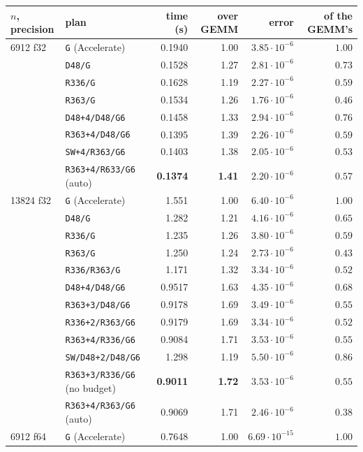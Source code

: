 \documentclass[11pt]{article}
\newcommand{\lv}[1]{\texttt{#1}}
\begin{document}
\begin{table}[tp]
\centering\small
\begin{tabular}{llrrrr}
\toprule
$n$, precision & plan & time (s) & over GEMM & error & of the GEMM's\\
\midrule
6912 f32 & \lv{G} (Accelerate) & 0.1940 & 1.00 & $3.85\cdot10^{-6}$ & $1.00$\\
 & \lv{D48/G} & 0.1528 & 1.27 & $2.81\cdot10^{-6}$ & $0.73$\\
 & \lv{R336/G} & 0.1628 & 1.19 & $2.27\cdot10^{-6}$ & $0.59$\\
 & \lv{R363/G} & 0.1534 & 1.26 & $1.76\cdot10^{-6}$ & $0.46$\\
 & \lv{D48+4/D48/G6} & 0.1458 & 1.33 & $2.94\cdot10^{-6}$ & $0.76$\\
 & \lv{R363+4/D48/G6} & 0.1395 & 1.39 & $2.26\cdot10^{-6}$ & $0.59$\\
 & \lv{SW+4/R363/G6} & 0.1403 & 1.38 & $2.05\cdot10^{-6}$ & $0.53$\\
\rowcolor{cR!12} & \lv{R363+4/R633/G6} (auto) & \textbf{0.1374} & \textbf{1.41} & $2.20\cdot10^{-6}$ & $0.57$\\
\midrule
13824 f32 & \lv{G} (Accelerate) & 1.551 & 1.00 & $6.40\cdot10^{-6}$ & $1.00$\\
 & \lv{D48/G} & 1.282 & 1.21 & $4.16\cdot10^{-6}$ & $0.65$\\
 & \lv{R336/G} & 1.235 & 1.26 & $3.80\cdot10^{-6}$ & $0.59$\\
 & \lv{R363/G} & 1.250 & 1.24 & $2.73\cdot10^{-6}$ & $0.43$\\
 & \lv{R336/R363/G} & 1.171 & 1.32 & $3.34\cdot10^{-6}$ & $0.52$\\
 & \lv{D48+4/D48/G6} & 0.9517 & 1.63 & $4.35\cdot10^{-6}$ & $0.68$\\
 & \lv{R363+3/D48/G6} & 0.9178 & 1.69 & $3.49\cdot10^{-6}$ & $0.55$\\
 & \lv{R336+2/R363/G6} & 0.9179 & 1.69 & $3.34\cdot10^{-6}$ & $0.52$\\
 & \lv{R363+4/R336/G6} & 0.9084 & 1.71 & $3.53\cdot10^{-6}$ & $0.55$\\
 & \lv{SW/D48+2/D48/G6} & 1.298 & 1.19 & $5.50\cdot10^{-6}$ & $0.86$\\
 & \lv{R363+3/R336/G6} (no budget) & \textbf{0.9011} & \textbf{1.72} & $3.53\cdot10^{-6}$ & $0.55$\\
\rowcolor{cR!12} & \lv{R363+4/R363/G6} (auto) & 0.9069 & 1.71 & $2.46\cdot10^{-6}$ & $0.38$\\
\midrule
6912 f64 & \lv{G} (Accelerate) & 0.7648 & 1.00 & $6.69\cdot10^{-15}$ & $1.00$\\

\end{tabular}
\end{table}
\end{document}
